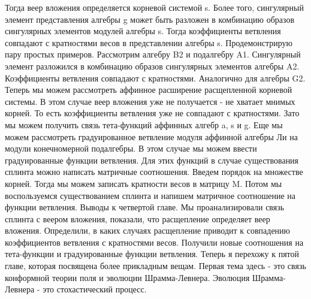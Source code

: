 \documentclass{article}
\begin{document}
Тогда веер вложения определяется корневой системой s. Более того, сингулярный элемент представления алгебры g может быть разложен в комбинацию образов сингулярных элементов модулей алгебры s. Тогда коэффициенты ветвления совпадают с кратностями весов в представлении алгебры s. 
Продемонстрирую пару простых примеров. Рассмотрим алгебру B2 и подалгебру A1. Сингулярный элемент разложился в комбинацию образов сингулярных элементов алгебры A2. Коэффициенты ветвления совпадают с кратностями. Аналогично для алгебры G2. 
Теперь мы можем рассмотреть аффинное расширение расщепленной корневой системы. В этом случае веер вложения уже не получается - не хватает мнимых корней. То есть коэффициенты ветвления уже не совпадают с кратностями. Зато мы можем получить связь тета-функций аффинных алгебр a, s и g. 
Еще мы можем рассмотреть градуированное ветвление модуля аффинной алгебры Ли на модули конечномерной подалгебры. В этом случае мы можем ввести градуированные функции ветвления. Для этих функций в случае существования сплинта можно написать матричные соотношения. 
Введем порядок на множестве корней. 
Тогда мы можем записать кратности весов в матрицу M. Потом мы воспользуемся существованием сплинта и напишем матричное соотношение на функции ветвления. 
Выводы к четвертой главе. 
Мы проанализировали связь сплинта с веером вложения, показали, что расщепление определяет веер вложения. 
Определили, в каких случаях расщепление приводит к совпадению коэффициентов ветвления с кратностями весов. 
Получили новые соотношения на тета-функции и градуированные функции ветвления. 
Теперь я перехожу к пятой главе, которая посвящена более прикладным вещам. Первая тема здесь - это связь конформной теории поля и эволюции Шрамма-Левнера. Эволюция Шрамма-Левнера - это стохастический процесс. 
\end{document}
